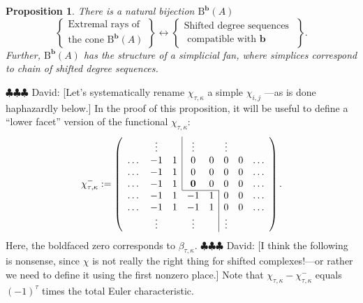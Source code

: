 \documentclass[12pt]{amsart}
\newtheorem{prop}[lemma]{Proposition}
\theoremstyle{definition}
\theoremstyle{remark}
\newcommand{\bb}{\mathbf{b}}
\newcommand{\BBQ}{\mathrm{B}}
\newcommand{\david}[1]{{\color{red} \sf $\clubsuit\clubsuit\clubsuit$ David: [#1]}}
\begin{document}
\begin{prop}\label{prop:conePP0 refined}
There is a natural bijection $\BBQ^{\bb}(A)$
\[
\left\{
\begin{matrix}
\text{Extremal rays of }\\
\text{the cone } \BBQ^{\bb}(A)
\end{matrix}
\right\}
\longleftrightarrow
\left\{
\begin{matrix}
\text{Shifted degree sequences }\\
\text{ compatible with $\bb$}
\end{matrix}
\right\}.
\]
Further, $\BBQ^{\bb}(A)$ has the structure of a simplicial fan, where simplices correspond to chain of shifted degree sequences.  
\end{prop}
\david{Let's systematically rename $\chi_{\tau, \kappa}$ a simple $\chi_{i,j}$ ---as is done haphazardly below.}
In the proof of this proposition, it will be useful to define a ``lower facet'' version of the functional $\chi_{\tau,\kappa}$:
\[
\chi^{-}_{\tau,\kappa}:=
\left(
\begin{array}{cccccccc}
 & \vdots& &\multicolumn{1}{|c}{\vdots}&& \vdots&&\\
\dots&-1&1&\multicolumn{1}{|c}{0}&0&0&0&\dots\\
\dots&-1&1&\multicolumn{1}{|c}{0}&0&0&0&\dots\\
\dots&-1&1&\multicolumn{1}{|c}{\mathbf{0}}&0&0&0&\dots\\ \cline{4-5}
\dots&-1&1&-1&1&\multicolumn{1}{|c}{0}&0&\dots\\
\dots&-1&1&-1&1&\multicolumn{1}{|c}{0}&0&\dots\\
& \vdots&&\vdots&& \multicolumn{1}{|c}{\vdots}&&\\
\end{array}
\right).
\]
Here, the boldfaced zero corresponds to $\beta_{\tau,\kappa}$.  
\david{I think the following is nonsense, since $\chi$ is not really the right thing for
shifted complexes!---or rather we need to define it using the first nonzero place.} 
Note that $\chi_{\tau,\kappa}-\chi_{\tau,\kappa}^{-}$ equals $(-1)^{\tau}$ times the total Euler characteristic.
\end{document}
